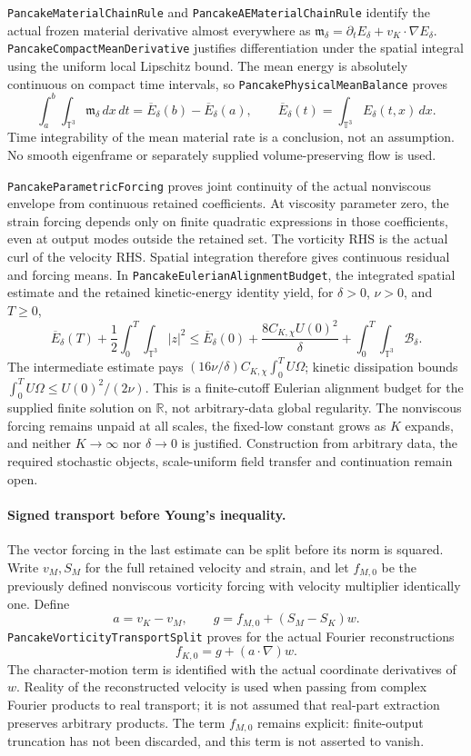 \documentclass[11pt]{article}
\theoremstyle{definition}
\begin{document}
\texttt{PancakeMaterialChainRule} and
\texttt{PancakeAEMaterialChainRule} identify the actual frozen material
derivative almost everywhere as
$\mathfrak m_\delta=\partial_tE_\delta+v_K\cdot\nabla E_\delta$.
\texttt{PancakeCompactMeanDerivative} justifies differentiation under the
spatial integral using the uniform local Lipschitz bound. The mean energy
is absolutely continuous on compact time intervals, so
\texttt{PancakePhysicalMeanBalance} proves
\[
 \int_a^b\!\int_{\mathbb T^3}\mathfrak m_\delta\,dx\,dt
   =\overline E_\delta(b)-\overline E_\delta(a),
 \qquad
 \overline E_\delta(t)=\int_{\mathbb T^3}E_\delta(t,x)\,dx.
\]
Time integrability of the mean material rate is a conclusion, not an
assumption. No smooth eigenframe or separately supplied
volume-preserving flow is used.

\texttt{PancakeParametricForcing} proves joint continuity of the actual
nonviscous envelope from continuous retained coefficients. At viscosity
parameter zero, the strain forcing depends only on finite quadratic
expressions in those coefficients, even at output modes outside the
retained set. The vorticity RHS is the actual curl of the velocity RHS.
Spatial integration therefore gives continuous residual and forcing
means. In \texttt{PancakeEulerianAlignmentBudget}, the integrated spatial
estimate and the retained kinetic-energy identity yield, for
$\delta>0$, $\nu>0$, and $T\ge0$,
\[
 \boxed{\quad
 \overline E_\delta(T)
   +\frac12\int_0^T\!\int_{\mathbb T^3}|z|^2
 \le \overline E_\delta(0)
   +\frac{8C_{K,\chi}U(0)^2}{\delta}
   +\int_0^T\!\int_{\mathbb T^3}\mathcal B_\delta.
 \quad}
\]
The intermediate estimate pays
$(16\nu/\delta)C_{K,\chi}\int_0^T U\Omega$; kinetic dissipation bounds
$\int_0^T U\Omega\le U(0)^2/(2\nu)$.
This is a finite-cutoff Eulerian alignment budget for the supplied
finite solution on $\mathbb R$, not arbitrary-data global regularity.
The nonviscous forcing remains unpaid at all scales, the fixed-low
constant grows as $K$ expands, and neither $K\to\infty$ nor
$\delta\to0$ is justified. Construction from arbitrary data, the required
stochastic objects, scale-uniform field transfer and continuation remain
open.

\paragraph{Signed transport before Young's inequality.}
The vector forcing in the last estimate can be split before its norm is
squared. Write $v_M,S_M$ for the full retained velocity and strain,
and let $f_{M,0}$ be the previously defined nonviscous vorticity forcing
with velocity multiplier identically one. Define
\[
 a=v_K-v_M,\qquad
 g=f_{M,0}+(S_M-S_K)w.
\]
\texttt{PancakeVorticityTransportSplit} proves for the actual Fourier
reconstructions
\[
 f_{K,0}=g+(a\cdot\nabla)w.
\]
The character-motion term is identified with the actual coordinate
derivatives of $w$. Reality of the reconstructed velocity is used when
passing from complex Fourier products to real transport; it is not
assumed that real-part extraction preserves arbitrary products.
The term $f_{M,0}$ remains explicit: finite-output truncation has not been
discarded, and this term is not asserted to vanish.
\end{document}
